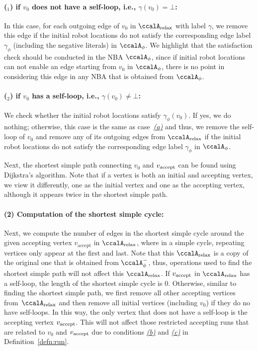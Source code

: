 \documentclass[Afour,sageh,times]{sagej}
\newcounter{mycounter}
\newcommand{\auto}[1]{\ccalA_{\textup{#1}}}
\newcommand{\autop}{\ccalA_{\phi}}
\newcommand{\vertex}[1]{v_{\textup{#1}}}
\begin{document}
{  \paragraph{($_1$) if $v_0$ does not have a self-loop, i.e., $\gamma(v_0)=\bot$:}\label{sec:initial} In this case, for each outgoing edge of $v_0$ in $\auto{relax}$ with label $\gamma$,  we remove this edge  if the initial robot locations do not satisfy the corresponding edge label $\gamma_{\phi}$ (including the negative literals) in $\autop$. We highlight that the satisfaction check should be conducted in the NBA $\autop$, since if initial robot locations can not enable an edge starting from $v_0$ in $\autop$, there is no point in considering this edge in any NBA that is obtained from $\autop$.
\paragraph{($_2$) if $v_0$ has a self-loop, i.e., $\gamma(v_0)\neq\bot$:} We check whether the initial robot locations satisfy $\gamma_{\phi}(v_0)$. If yes, we do nothing; otherwise, this case is the  same as case~\hyperref[sec:initial]{\it (a)} and thus, we remove the self-loop of $v_0$ and
remove any of its  outgoing edges  from $\auto{relax}$ if the initial robot locations do not satisfy the corresponding edge label $\gamma_{\phi}$ in $\autop$.

Next, the shortest simple path connecting $v_0$ and $\vertex{accept}$ can be found using Dijkstra's algorithm.  Note that if a vertex is both an initial and accepting vertex, we view it differently, one as the initial vertex and one as the accepting vertex, although it appears twice in the shortest simple path.
\paragraph{(2) Computation of the shortest simple cycle:} Next, we compute the number of edges in the shortest simple cycle around the given accepting vertex $v_\text{accept}$ in $\auto{relax}$, where in a simple cycle, repeating vertices only appear at the first and last. Note that this $\auto{relax}$ is a copy of the original one that is obtained from $\autop^-$, thus, operations used to  find the shortest simple  path will not affect this $\auto{relax}$. If $\vertex{accept}$ in $\auto{relax}$ has a self-loop, the length of the shortest simple cycle is 0. Otherwise, similar to finding the shortest simple path, we first remove all other accepting vertices from~$\auto{relax}$ and then remove all initial vertices (including $v_0$) if they do no have self-loops.  In this way, the only vertex that does not have a self-loop is the accepting vertex $\vertex{accept}$.  This will not affect those restricted accepting runs that are related to  $v_0$ and $\vertex{accept}$  due to conditions \hyperref[cond:b]{\it (b)} and \hyperref[cond:c]{\it (c)} in Definition~\ref{defn:run}.


}
\end{document}
